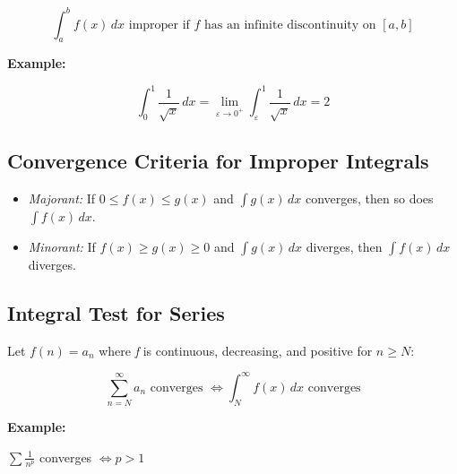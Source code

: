 \[
    \int_a^b f(x)\,dx \text{ improper if } f \text{ has an infinite discontinuity on } [a, b]
\]

\textbf{Example:}

\[
    \int_0^1 \frac{1}{\sqrt{x}}\,dx = \lim_{\varepsilon \to 0^+} \int_\varepsilon^1 \frac{1}{\sqrt{x}}\,dx = 2
\]

\subsection{Convergence Criteria for Improper Integrals}

\begin{itemize}

    \item \emph{Majorant:} If \(0 \le f(x) \le g(x)\) and \(\int g(x)\,dx\) converges, then so does \(\int f(x)\,dx\).

    \item \emph{Minorant:} If \(f(x) \ge g(x) \ge 0\) and \(\int g(x)\,dx\) diverges, then \(\int f(x)\,dx\) diverges.

\end{itemize}

\subsection{Integral Test for Series}

Let \(f(n) = a_n\) where \emph{f} is continuous, decreasing, and positive for \(n \ge N\):

\[
    \sum_{n=N}^\infty a_n \text{ converges } \iff \int_N^\infty f(x)\,dx \text{ converges}
\]

\textbf{Example:}
\vspace{\baselineskip}
 
\(\sum \frac{1}{n^p}\) converges \(\iff p > 1\)
